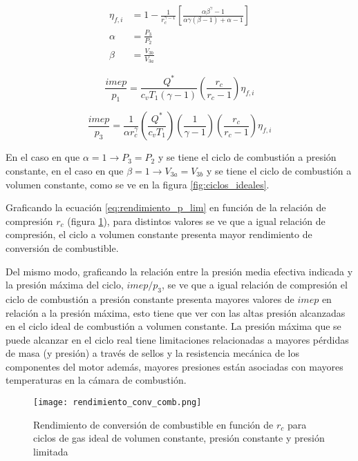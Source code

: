 \begin{align}
    \label{eq:rendimiento_p_lim}
    \eta_{f,i} &= 1 - \frac{1}{r_c^{\gamma - 1}} \left[ \frac{\alpha \beta^\gamma-1}{\alpha \gamma (\beta-1)+\alpha-1} \right]\\ \alpha &= \frac{P_3}{P_2}\\ \beta &= \frac{V_{3b}}{V_{3a}}
\end{align}

\begin{equation}
    \label{eq:imep_p1} \frac{imep}{p_1} = \frac{Q^*}{c_v T_1 (\gamma-1)} \left( \frac{r_c}{r_c-1} \right) \eta_{f,i}
\end{equation}

\begin{equation}
    \label{eq:imep_p3} \frac{imep}{p_3} = \frac{1}{\alpha r_c^\gamma} \left( \frac{Q^*}{c_v T_1} \right) \left(\frac{1}{\gamma-1} \right) \left( \frac{r_c}{r_c-1} \right) \eta_{f,i}
\end{equation}

En el caso en que  $\alpha=1 \rightarrow P_3=P_2$ y se tiene el ciclo de
combustión a presión constante, en el caso en que
$\beta=1 \rightarrow V_{3a}=V_{3b}$ y se tiene el ciclo de combustión a volumen
constante, como se ve en la figura \ref{fig:ciclos_ideales}.

Graficando la ecuación \ref{eq:rendimiento_p_lim} en función de la relación de
compresión $r_c$ (figura \ref{fig:rendimientos}), para distintos valores se ve
que a igual relación de compresión, el ciclo a volumen constante presenta mayor
rendimiento de conversión de combustible.

Del mismo modo, graficando la relación entre la presión media efectiva indicada
y la presión máxima del ciclo, $imep/p_3$, se ve que a igual relación de
compresión el ciclo de combustión a presión constante presenta mayores valores
de $imep$ en relación a la presión máxima, esto tiene que ver con las altas
presión alcanzadas en el ciclo ideal de combustión a volumen constante.
%
La presión máxima que se puede alcanzar en el ciclo real tiene limitaciones
relacionadas a mayores pérdidas de masa (y presión) a través de sellos y la
resistencia mecánica de los componentes del motor además, mayores presiones
están asociadas con mayores temperaturas en la cámara de combustión.

\begin{figure} \centering
\texttt{[image: rendimiento\_conv\_comb.png]}
    \caption{Rendimiento de conversión de combustible en función de $r_c$ para
ciclos de gas ideal de volumen constante, presión constante y presión
limitada} \label{fig:rendimientos}
\end{figure}


